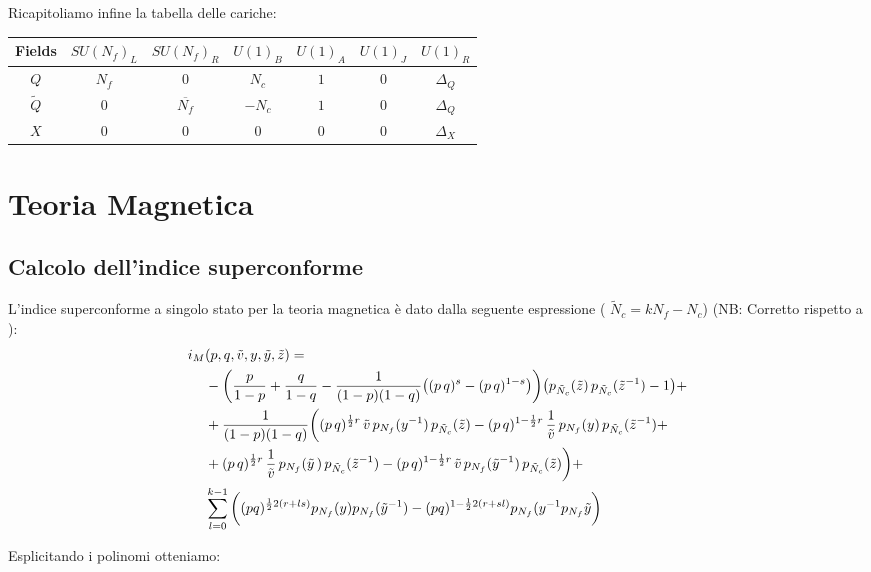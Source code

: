 \documentclass[a4paper,12pt]{article}
\begin{document}
Ricapitoliamo infine la tabella delle cariche:
\begin{table}[h!]
 \begin{tabular}{|c |c |c |c |c |c |c |}
\hline
Fields & $SU(N_f)_L$ & $SU(N_f)_R$ & $U(1)_B$ & $U(1)_A$ & $U(1)_J$ & $U(1)_R $ \\
\hline
$Q$ & $N_f$ & 0  &$ N_c $& $1 $& 0  & $\Delta_Q$ \\
$\tilde{Q} $  & 0  &$\overline{N_f}$ & $ - N_c $& $1 $ & 0 & $\Delta_Q$ \\
$X$ & 0 & 0 & 0 & 0 &0 & $\Delta_X$ \\
\hline
\end{tabular}
\centering
\end{table}

\newpage
\section{ Teoria Magnetica}
\subsection{Calcolo dell'indice superconforme}
L'indice superconforme a singolo stato per la teoria magnetica è dato dalla seguente espressione ( $\tilde N_c = k N_f - N_c$) (NB: Corretto rispetto a \citep{Dolan:2008qi}):
\begin{align*}
 i_M &(p,q, \tilde v, y,\tilde y ,\tilde z) =  \\ 
& -\bigg({p \over 1-p}+{q \over 1-q} -{1 \over (1-p)(1-q)} \big((p\,q)^{s}- (p\,q)^{1-s}\big)
\bigg) \big( p_{\tilde N_c}( \tilde z)\, p_{\tilde N_c}(\tilde z^{-1})-1\big ) + \\ 
& +{1\over (1-p)(1-q)}\bigg((p\,q)^{{1 \over 2 } r} \,\tilde v \, p_{N_f}(y^{-1})\, p_{\tilde N_c}(\tilde z)
- (p\,q)^{1-  {1\over 2}r} \, {1 \over \tilde v}\, p_{{N_f}}(y)\, p_{{\tilde N_c}}(\tilde z^{-1}) + \\
& + (p\,q)^{{1 \over 2 } r}\, {1\over \tilde v}\, p_{{N_f}}({\tilde y}\,) \, p_{{\tilde N_c}}(\tilde z^{-1})
- (p\,q)^{1-{1\over 2}r} \, \tilde v \, p_{N_f}({\tilde y}^{-1})\, p_{\tilde N_c}(\tilde z)\bigg) +  \,\\
&\sum_{l=0}^{k-1}   \bigg( (pq)^{ {1 \over 2 } 2 ( r + l s  )} p_{N_f}(y) p_{N_f}(\tilde y^{-1}) - (pq)^{1 -  {1 \over 2 } 2 ( r + s l )} p_{N_f}(y^{-1} p_{N_f}{\tilde y}\bigg)  \\
\end{align*}

Esplicitando i polinomi otteniamo:
\end{document}
